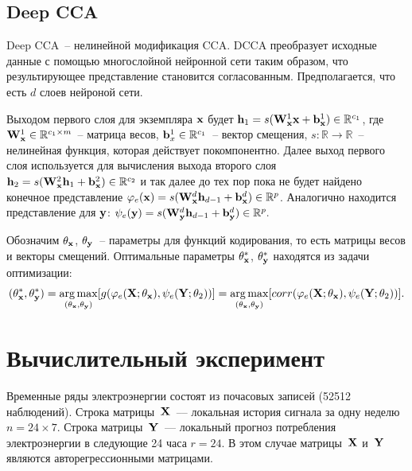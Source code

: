 \subsection{Deep CCA}

Deep CCA~-- нелинейной модификация CCA. DCCA преобразует исходные данные с помощью многослойной нейронной сети таким образом, что результирующее представление становится согласованным. Предполагается, что есть $d$ слоев нейроной сети. 

Выходом первого слоя для экземпляра $\mathbf{x}$ будет $\mathbf{h}_1 = s(\mathbf{W}^{1}_{\mathbf{x}}\mathbf{x} + \mathbf{b}^{1}_{\mathbf{x}}) \in \mathbb{R}^{c_1}$, где $\mathbf{W}_{\mathbf{x}}^{1} \in \mathbb{R}^{c_1 \times m}$~-- матрица весов, $\mathbf{b}_{x}^{1} \in \mathbb{R}^{c_1}$~-- вектор смещения, $s: \mathbb{R} \to \mathbb{R}$~-- нелинейная функция, которая действует покомпонентно. Далее выход первого слоя используется для вычисления выхода второго слоя $\mathbf{h}_{2} = s(\mathbf{W}^{2}_{\mathbf{x}}\mathbf{h}_{1} + \mathbf{b}^{2}_{\mathbf{x}}) \in \mathbb{R}^{c_2}$ и так далее до тех пор пока не будет найдено конечное представление $\varphi_e(\mathbf{x}) = s(\mathbf{W}^{d}_{\mathbf{x}}\mathbf{h}_{d-1} + \mathbf{b}^{d}_{\mathbf{x}}) \in \mathbb{R}^{p}$. Аналогично находится представление для $\mathbf{y}$: $\psi_e(\mathbf{y}) = s(\mathbf{W}^{d}_{\mathbf{y}}\mathbf{h}_{d-1} + \mathbf{b}^{d}_{\mathbf{y}}) \in \mathbb{R}^{p}.$

Обозначим $\theta_{\mathbf{x}}$, $\theta_{\mathbf{y}}$~-- параметры для функций кодирования, то есть матрицы весов и векторы смещений. Оптимальные параметры $\theta_{\mathbf{x}}^{*}$, $\theta_{\mathbf{y}}^{*}$ находятся из задачи оптимизации:
\begin{equation}
(\theta_{\mathbf{x}}^{*}, \theta_{\mathbf{y}}^{*}) = \mathop{\arg \max}\limits _{(\theta_{\mathbf{x}}, \theta_{\mathbf{y}})} [g(\varphi_e(\mathbf{X}; \theta_{\mathbf{x}}), \psi_e(\mathbf{Y}; \theta_{2}))] = \mathop{\arg \max}\limits _{(\theta_{\mathbf{x}}, \theta_{\mathbf{y}})} [corr(\varphi_e(\mathbf{X}; \theta_{\mathbf{x}}), \psi_e(\mathbf{Y}; \theta_{2}))].
\end{equation}

\section{Вычислительный эксперимент}

Временные ряды электроэнергии состоят из почасовых записей (52512 наблюдений). 
Строка матрицы~$\mathbf{X}$~--– локальная история сигнала за одну неделю $n = 24 \times 7$. Строка матрицы~$\mathbf{Y}$~--- локальный прогноз потребления электроэнергии в следующие 24 часа $r = 24$. В этом случае матрицы~$\mathbf{X}$ и~$\mathbf{Y}$ являются авторегрессионными матрицами.

